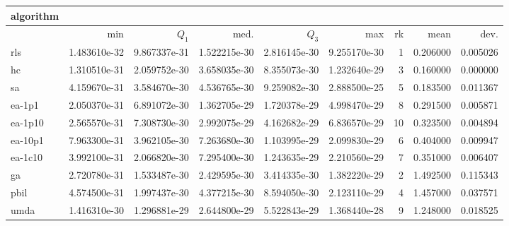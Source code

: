 \begin{tabular}{@{}l*{5}{>{{}}N{1}{1}}>{{}}N{2}{0}N{1}{3}N{1}{3}@{}}
\toprule
{algorithm} &  &  \\
\midrule
& {min} & {$Q_1$} & {med.} & {$Q_3$} & {max} & {rk} & {mean} & {dev.} \\
\midrule
rls & {\color{blue}} 1.483610e-32 & {\color{blue}} 9.867337e-31 & {\color{blue}} 1.522215e-30 & {\color{blue}} 2.816145e-30 & {\color{blue}} 9.255170e-30 & 1 & 0.206000 & 0.005026 \\
 hc & 1.310510e-31 & 2.059752e-30 & 3.658035e-30 & 8.355073e-30 & 1.232640e-29 & 3 & 0.160000 & 0.000000 \\
 sa & 4.159670e-31 & 3.584670e-30 & 4.536765e-30 & 9.259082e-30 & 2.888500e-25 & 5 & 0.183500 & 0.011367 \\
 ea-1p1 & 2.050370e-31 & 6.891072e-30 & 1.362705e-29 & 1.720378e-29 & 4.998470e-29 & 8 & 0.291500 & 0.005871 \\
 ea-1p10 & 2.565570e-31 & 7.308730e-30 & 2.992075e-29 & 4.162682e-29 & 6.836570e-29 & 10 & 0.323500 & 0.004894 \\
 ea-10p1 & 7.963300e-31 & 3.962105e-30 & 7.263680e-30 & 1.103995e-29 & 2.099830e-29 & 6 & 0.404000 & 0.009947 \\
 ea-1c10 & 3.992100e-31 & 2.066820e-30 & 7.295400e-30 & 1.243635e-29 & 2.210560e-29 & 7 & 0.351000 & 0.006407 \\
 ga & 2.720780e-31 & 1.533487e-30 & 2.429595e-30 & 3.414335e-30 & 1.382220e-29 & 2 & 1.492500 & 0.115343 \\
 pbil & 4.574500e-31 & 1.997437e-30 & 4.377215e-30 & 8.594050e-30 & 2.123110e-29 & 4 & 1.457000 & 0.037571 \\
 umda & 1.416310e-30 & 1.296881e-29 & 2.644800e-29 & 5.522843e-29 & 1.368440e-28 & 9 & 1.248000 & 0.018525 \\
 \bottomrule
\end{tabular}
